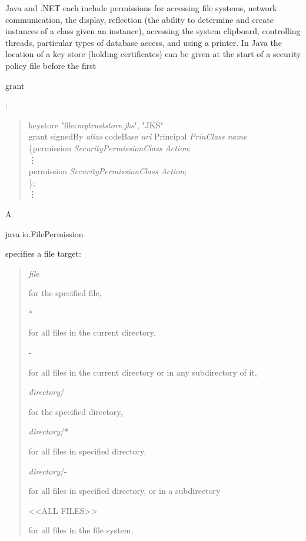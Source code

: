 Java and .NET each include permissions for accessing file systems, network communication,
the display, reflection (the ability to determine and create instances of a class given an
instance), accessing the system clipboard, controlling threads,
particular types of database access, and using a printer.
In Java the location of a key store (holding certificates)
can be given at the start of a security policy file before the first \begin{code}grant\end{code}:
\begin{quote}\begin{code}
keystore "file:\emph{mytruststore.jks}", "JKS" \\
grant signedBy \emph{alias} codeBase \emph{uri} Principal \emph{PrinClass} \emph{name} \\
\{\dbind permission \emph{SecurityPermissionClass} \emph{Action}; \\
\trind \vdots \\
\trind permission \emph{SecurityPermissionClass} \emph{Action}; \\
\}; \\
\vdots
\end{code}\end{quote}
A \begin{code}java.io.FilePermission\end{code} specifies a file target:
\begin{quote}
  \begin{code}\emph{file}\end{code} for the specified file, \\
  \begin{code}*\end{code} for all files in the current directory, \\
  \begin{code}-\end{code} for all files in the current directory or in any subdirectory of it, \\
  \begin{code}\emph{directory}/\end{code} for the specified directory, \\
  \begin{code}\emph{directory}/*\end{code} for all files in specified directory, \\
  \begin{code}\emph{directory}/-\end{code} for all files in specified directory,
  or in a subdirectory\\
  \begin{code}<<ALL FILES>>\end{code} for all files in the file system,
\end{quote}
